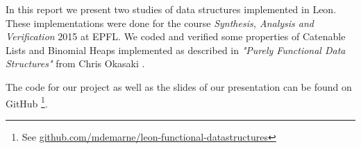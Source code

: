 In this report we present two studies of data structures implemented in Leon. 
These implementations were done for the course \emph{Synthesis, Analysis and Verification} 2015 at EPFL.
We coded and verified some properties of
Catenable Lists and Binomial Heaps
implemented as described in \emph{"Purely Functional Data Structures"} from Chris Okasaki
\cite{Okasaki}.

The code for our project as well as the slides of our presentation 
can be found on GitHub
\footnote{See \href{https://github.com/mdemarne/leon-functional-datastructures}{github.com/mdemarne/leon-functional-datastructures}}.